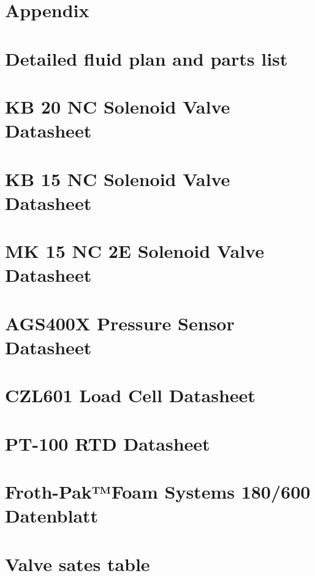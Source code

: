 \section*{Appendix}
%
\section{Detailed fluid plan and parts list}
\label{appendix:detailed_fluid_plan}


%
\section{KB 20 NC Solenoid Valve Datasheet}
\label{appendix:KB_20_NC_2E}

%
\section{KB 15 NC Solenoid Valve Datasheet}
\label{appendix:KB_15_NC}

%
\section{MK 15 NC 2E Solenoid Valve Datasheet}
\label{appendix:MK_15_NC_2E}

%
\section{AGS400X Pressure Sensor Datasheet}
\label{appendix:AGS400X}

%
\section{CZL601 Load Cell Datasheet}
\label{appendix:CZL601}

%
\section{PT-100 RTD Datasheet}
\label{appendix:PT-100}

%
\section{Froth-Pak™Foam Systems 180/600 Datenblatt}
\label{appendix:Fomicon}

%
\section{Valve sates table}
\label{appendix:valve_states_table}







